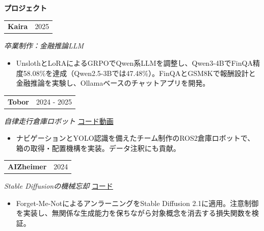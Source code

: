 \documentclass[11pt,a4paper]{article}
\makeatletter
\newcommand{\cvlink}[2]{\href{#1}{\textcolor{linkblue}{#2}}}
\newcommand{\cvsep}{\enspace\textperiodcentered\enspace{}}
\newcommand{\cvsection}[3][5]{%
  \par\Needspace*{#1\baselineskip}\vspace{6pt}%
  {\bfseries\fontsize{11}{13}\selectfont #3}\par\nobreak
  \vspace{3pt}{\color{muted}\hrule height 0.4pt}\nobreak\vspace{6pt}%
}
\newcommand{\cvheading}[2]{%
  \begin{tabularx}{\linewidth}{@{}>{\raggedright\arraybackslash}X@{\hspace{10pt}}r@{}}%
  \textbf{#1} & {\small\color{muted}#2}\\
  \end{tabularx}\par\nobreak
}
\newenvironment{cvpoints}{\begin{itemize}[leftmargin=12pt,itemsep=2pt,topsep=2pt,parsep=0pt]\small}{\end{itemize}}
\makeatother
\begin{document}
\cvsection{}{プロジェクト}
\begin{minipage}{\linewidth}\raggedright
\cvheading{Kaira}{2025}
{\small{}\itshape{}\color{muted}卒業制作：金融推論LLM}\hfill{\small{}%
%
}\par\vspace{2pt}
\begin{cvpoints}
\item UnslothとLoRAによるGRPOでQwen系LLMを調整し、Qwen3-4BでFinQA精度58.08\%を達成（Qwen2.5-3Bでは47.48\%）。FinQAとGSM8Kで報酬設計と金融推論を実験し、Ollamaベースのチャットアプリを開発。
\end{cvpoints}
\end{minipage}\par\vspace{5pt}
\begin{minipage}{\linewidth}\raggedright
\cvheading{Tobor}{2024 - 2025}
{\small{}\itshape{}\color{muted}自律走行倉庫ロボット}\hfill{\small{}%
\mbox{\cvlink{https://github.com/rusen-archive/Amazon-Warehouse-Robot}{コード}}\cvsep\mbox{\cvlink{https://youtu.be/h-Jxs_y9kNA}{動画}}%
}\par\vspace{2pt}
\begin{cvpoints}
\item ナビゲーションとYOLO認識を備えたチーム制作のROS2倉庫ロボットで、箱の取得・配置機構を実装。データ注釈にも貢献。
\end{cvpoints}
\end{minipage}\par\vspace{5pt}
\begin{minipage}{\linewidth}\raggedright
\cvheading{AIZheimer}{2024}
{\small{}\itshape{}\color{muted}Stable Diffusionの機械忘却}\hfill{\small{}%
\mbox{\cvlink{https://github.com/rusenbb/ai-zheimer}{コード}}%
}\par\vspace{2pt}
\begin{cvpoints}
\item Forget-Me-NotによるアンラーニングをStable Diffusion 2.1に適用。注意制御を実装し、無関係な生成能力を保ちながら対象概念を消去する損失関数を検証。
\end{cvpoints}
\end{minipage}\par\vspace{5pt}
\end{document}
